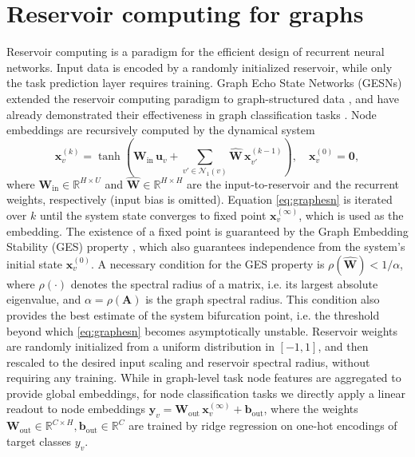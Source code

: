 \documentclass{esannV2p}
\begin{document}
\section{Reservoir computing for graphs}\label{sec:graphesn}
Reservoir computing is a paradigm for the efficient design of recurrent neural networks.
Input data is encoded by a randomly initialized reservoir, while only the task prediction layer requires training.
Graph Echo State Networks (GESNs) extended the reservoir computing paradigm to graph-structured data \cite{Gallicchio2010}, and have already demonstrated their effectiveness in graph classification tasks \cite{Gallicchio2020}.
Node embeddings are recursively computed by the dynamical system
\begin{equation}\label{eq:graphesn}\textstyle
  \mathbf{x}_v^{(k)} = \tanh\left(\mathbf{W}_{\mathrm{in}}\, \mathbf{u}_v + \sum_{v' \in \mathcal{N}_1(v)} \mathbf{\hat{W}}\, \mathbf{x}_{v'}^{(k-1)}\right),\quad \mathbf{x}_v^{(0)} = \mathbf{0},
\end{equation}
where $\mathbf{W}_{\mathrm{in}} \in \mathbb{R}^{H \times U}$ and $\mathbf{\hat{W}} \in \mathbb{R}^{H \times H}$ are the input-to-reservoir and the recurrent weights, respectively (input bias is omitted).
Equation \eqref{eq:graphesn} is iterated over $k$ until the system state converges to fixed point $\mathbf{x}_v^{(\infty)}$, which is used as the embedding.
The existence of a fixed point is guaranteed by the Graph Embedding Stability (GES) property \cite{Gallicchio2020}, which also guarantees independence from the system's initial state $\mathbf{x}_v^{(0)}$.
A necessary condition \cite{Tortorella2022} for the GES property is $\rho(\mathbf{\hat{W}}) < 1 / \alpha$, where $\rho(\cdot)$ denotes the spectral radius of a matrix, i.e. its largest absolute eigenvalue, and $\alpha = \rho(\mathbf{A})$ is the graph spectral radius.
This condition also provides the best estimate of the system bifurcation point, i.e. the threshold beyond which \eqref{eq:graphesn} becomes asymptotically unstable.
Reservoir weights are randomly initialized from a uniform distribution in $[-1,1]$, and then rescaled to the desired input scaling and reservoir spectral radius, without requiring any training.
While in graph-level task node features are aggregated to provide global embeddings, for node classification tasks we directly apply a linear readout to node embeddings $\mathbf{y}_v = \mathbf{W}_\mathrm{out}\, \mathbf{x}_v^{(\infty)} + \mathbf{b}_\mathrm{out}$, where the weights $\mathbf{W}_\mathrm{out} \in \mathbb{R}^{C \times H}, \mathbf{b}_\mathrm{out} \in \mathbb{R}^C$ are trained by ridge regression on one-hot encodings of target classes $y_v$.
\end{document}

